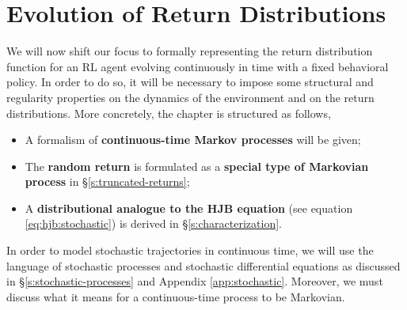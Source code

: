 \chapter{Evolution of Return Distributions}\label{c:evolution}
We will now shift our focus to formally representing the return
distribution function for an RL agent evolving continuously in time
with a fixed behavioral policy. In order to do so, it will be
necessary to impose some structural and regularity properties on the
dynamics of the environment and on the return distributions. More concretely,
the chapter is structured as follows,

\begin{itemize}
  \item A formalism of \textbf{continuous-time Markov processes} will be given;
  \item The \textbf{random return} is formulated as a \textbf{special type of
    Markovian process} in \S\ref{s:truncated-returns};
  \item A \textbf{distributional analogue to the HJB equation} (see
    equation \eqref{eq:hjb:stochastic}) is derived in \S\ref{s:characterization}.
\end{itemize}

In order to model stochastic trajectories in continuous time, we will use the
language of stochastic processes and stochastic differential equations as
discussed in \S\ref{s:stochastic-processes} and Appendix \ref{app:stochastic}.
Moreover, we must discuss what it means for a continuous-time process to be
Markovian.

